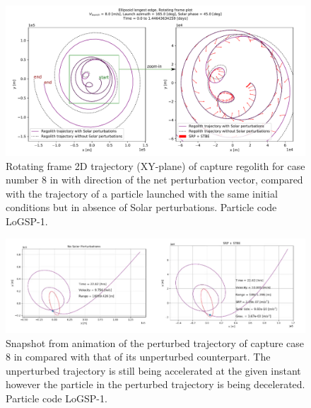 \begin{figure}[htb]
\centering
\captionsetup{justification=centering}
\includegraphics[angle=90, width=\textwidth, height=\textheight, keepaspectratio=true]{longest_edge_perturbations/3.2Density_1cmSize/8ms_165Azimuth_45SolarPhase/comparative_analysis_allPerturbations_rotatingFrame_edited.pdf}
\caption{Rotating frame 2D trajectory (XY-plane) of capture regolith for case number 8 in  with direction of the net perturbation vector, compared with the trajectory of a particle launched with the same initial conditions but in absence of Solar perturbations. Particle code LoGSP-1.}
\label{fig:LoGSP_1_capture_case_8_2d_trajectory_comparative_bodyFrame}
\end{figure}
\FloatBarrier
\begin{figure}[htb]
\centering
\captionsetup{justification=centering}
\includegraphics[angle=90, width=\textwidth, height=\textheight, keepaspectratio=true]{longest_edge_perturbations/3.2Density_1cmSize/8ms_165Azimuth_45SolarPhase/comparative_analysis_allPerturbations_phasing_animation_example.pdf}
\caption{Snapshot from animation of the perturbed trajectory of capture case 8 in  compared with that of its unperturbed counterpart. The unperturbed trajectory is still being accelerated at the given instant however the particle in the perturbed trajectory is being decelerated. Particle code LoGSP-1.}
\label{fig:LoGSP_1_capture_case_8_2d_trajectory_comparative_animation_phasing_snapshot}
\end{figure}
